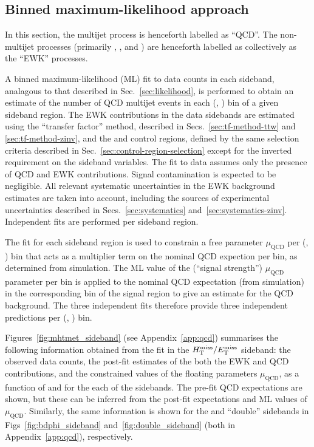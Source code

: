 \subsection{Binned maximum-likelihood approach}

In this section, the multijet process is henceforth labelled as
``QCD''. The non-multijet processes (primarily \wj, \ttbar, and
\znunu) are henceforth labelled as collectively as the ``EWK''
processes.

A binned maximum-likelihood (ML) fit to data counts in each sideband,
analagous to that described in Sec.~\ref{sec:likelihood}, is performed
to obtain an estimate of the number of QCD multijet events in each
(\njet, \scalht) bin of a given sideband region. The EWK contributions
in the data sidebands are estimated using the ``transfer factor''
method, described in Secs.~\ref{sec:tf-method-ttw} and
\ref{sec:tf-method-zinv}, and the \mj and \mmj control regions,
defined by the same selection criteria described in
Sec.~\ref{sec:control-region-selection} except for the inverted
requirement on the sideband variables. The fit to data assumes only
the presence of QCD and EWK contributions. Signal contamination is
expected to be negligible. All relevant systematic uncertainties in
the EWK background estimates are taken into account, including the
sources of experimental uncertainties described in
Secs.~\ref{sec:systematics}
and~\ref{sec:systematics-zinv}. Independent fits are performed per
sideband region.

The fit for each sideband region is used to constrain a free parameter
$\mu_{\textrm{QCD}}$ per (\njet, \scalht) bin that acts as a
multiplier term on the nominal QCD expection per bin, as determined
from simulation. The ML value of the (``signal strength'')
$\mu_{\textrm{QCD}}$ parameter per bin is applied to the nominal QCD
expectation (from simulation) in the corresponding bin of the signal
region to give an estimate for the QCD background. The three
independent fits therefore provide three independent predictions per
(\njet, \scalht) bin.

Figures~\ref{fig:mhtmet_sideband} (see Appendix~\ref{app:qcd})
summarises the following information obtained from the fit in the
$\mbox{$\mbox{$H_{\rm T}^{\rm miss}$} / \mbox{$E_\text{T}^{\rm miss}$}$}$ sideband: the observed data counts, the post-fit estimates
of the both the EWK and QCD contributions, and the constrained values
of the floating parameters $\mu_{\textrm{QCD}}$, as a function of
\njet and \scalht for the each of the sidebands. The pre-fit QCD
expectations are shown, but these can be inferred from the post-fit
expectations and ML values of $\mu_{\textrm{QCD}}$. Similarly, the
same information is shown for the \bdphi and ``double'' sidebands in
Figs~\ref{fig:bdphi_sideband} and~\ref{fig:double_sideband} (both in
Appendix~\ref{app:qcd}), respectively.

